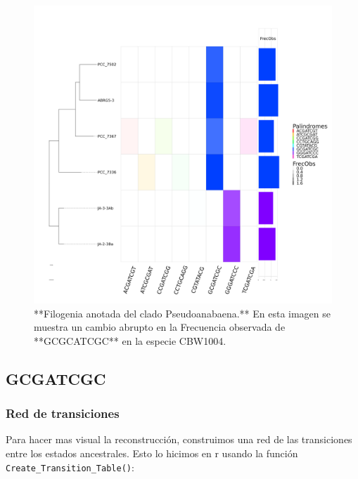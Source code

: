 \documentclass[
]{book}
\begin{document}
\begin{figure}

{\centering \includegraphics[width=1\linewidth]{Clados/Pseudoanabaena_clade/figures/pseudoanabaena_Octanuc_FrecObs_sel32_filogenia_HIG} 

}

\caption{**Filogenia anotada del clado Pseudoanabaena.** En esta imagen se muestra un cambio abrupto en la Frecuencia observada de **GCGCATCGC** en la especie CBW1004.}\label{fig:FIG12P}
\end{figure}

\hypertarget{gcgatcgc-3}{%
\subsection{GCGATCGC}\label{gcgatcgc-3}}

\hypertarget{red-de-transiciones-4}{%
\subsubsection{Red de transiciones}\label{red-de-transiciones-4}}

Para hacer mas visual la reconstrucción, construimos una red de las transiciones entre los estados ancestrales. Esto lo hicimos en r usando la función \texttt{Create\_Transition\_Table()}:
\end{document}
